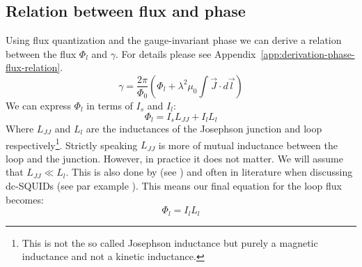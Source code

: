 \subsection{Relation between flux and phase}
\label{sec:flux-phase-relation}
Using flux quantization and the gauge-invariant phase we can derive a relation between the flux $\Phi_l$ and $\gamma$. For details please see Appendix~\ref{app:derivation-phase-flux-relation}.
\begin{equation}
	\gamma = \frac{2\pi}{\Phi_0}\left(\Phi_l + \lambda^2\mu_0 \int \vec{J}\cdot d \vec{l} \right)
	\label{eqn:phase-flux-relation}
\end{equation}
We can express $\Phi_l$ in terms of $I_s$ and $I_l$:
\begin{equation}
	\Phi_l = I_sL_{JJ}  + I_lL_l
\end{equation}
Where $L_{JJ}$ and $L_l$ are the inductances of the Josephson junction and loop respectively\footnote{This is not the so called Josephson inductance but purely a magnetic inductance and not a kinetic inductance.}. Strictly speaking $L_{JJ}$ is more of mutual inductance between the loop and the junction. However, in practice it does not matter. We will assume that $L_{JJ} \ll L_l$. This is also done by \citeauthor{frolovMeasurementCurrentPhaseRelation2004} (see \cite{frolovCurrentphaseRelationsJosephson2005,frolovMeasurementCurrentPhaseRelation2004}) and often in literature when discussing dc-SQUIDs (see par example \cite{clarkeSQUIDHandbook2004}). This means our final equation for the loop flux becomes:
\begin{equation}
	\Phi_l = I_lL_l
\end{equation}

